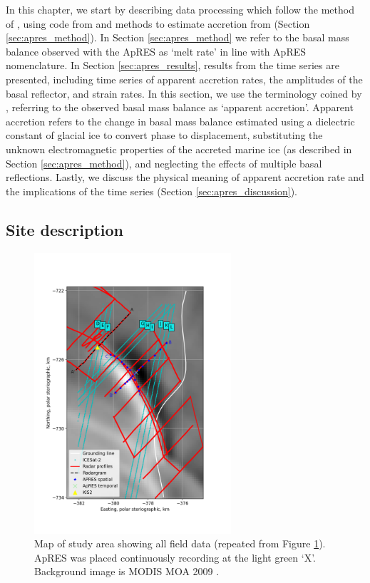 In this chapter, we start by describing data processing  which follow the method of \cite{nicholls2015ground}, using code from \cite{stewart2018ice} and methods to estimate accretion from \cite{vavnkova2021nature} (Section \ref{sec:apres_method}). In Section \ref{sec:apres_method} we refer to the basal mass balance observed with the ApRES as `melt rate' in line with ApRES nomenclature. In Section \ref{sec:apres_results}, results from the time series are presented, including time series of apparent accretion rates, the amplitudes of the basal reflector, and strain rates. In this section, we use the terminology coined by \cite{vavnkova2021nature}, referring to the observed basal mass balance as `apparent accretion'. Apparent accretion refers to the change in basal mass balance estimated using a dielectric constant of glacial ice to convert phase to displacement, substituting the unknown electromagnetic properties of the accreted marine ice (as described in Section \ref{sec:apres_method}), and neglecting the effects of multiple basal reflections.
 Lastly, we discuss the physical meaning of apparent accretion rate and the implications of the time series (Section \ref{sec:apres_discussion}).

\subsection{Site description}
\newpage
\begin{figure}[!ht]
\centering
\includegraphics[width=0.65\textwidth]{chapters/2/geophysics_overview.png}
\caption[Map of field data]{Map of study area showing all field data (repeated from Figure \ref{fig:geophysics_overview_apres}). ApRES was placed continuously recording at the light green `X'.
Background image is MODIS MOA 2009 \citep{haran2014modis}. 
}
\label{fig:geophysics_overview_apres}
\end{figure}


